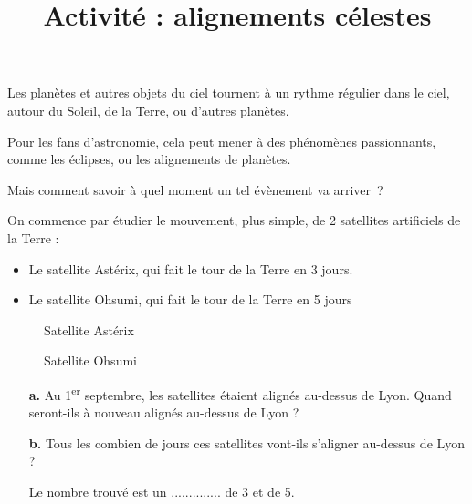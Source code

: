 \documentclass[a4paper,landscape,twocolumn]{article}
\title{Activité : alignements célestes}
\date{}
\begin{document}
\noindent\textbf{\huge {}}
\vspace{1em}

\begin{mybox}
	Les planètes et autres objets du ciel tournent à un rythme régulier dans le ciel, autour du Soleil, de la Terre, ou d’autres planètes.

	Pour les fans d’astronomie, cela peut mener à des phénomènes passionnants, comme les éclipses, ou les alignements de planètes.

	Mais comment savoir à quel moment un tel évènement va arriver ?
\end{mybox}
\begin{question}
	On commence par étudier le mouvement, plus simple, de 2 satellites artificiels de la Terre :
	\begin{itemize}
		\item Le satellite Astérix, qui fait le tour de la Terre en 3 jours.
		\item Le satellite Ohsumi, qui fait le tour de la Terre en 5 jours
	\end{itemize}

	\begin{figure}[h!]
		\captionsetup{labelformat=empty}
		\begin{floatrow}
			{\caption{Satellite Astérix}}

			{\caption{Satellite Ohsumi}}
		\end{floatrow}
	\end{figure}
	\begin{itemize}
		\item[\textbf{a.}] Au 1\textsuperscript{er} septembre, les satellites étaient alignés au-dessus de Lyon. Quand seront-ils à nouveau alignés au-dessus de Lyon ?
		\item[\textbf{b.}] Tous les combien de jours ces satellites vont-ils s'aligner au-dessus de Lyon ?

		      Le nombre trouvé est un .............. de 3 et de 5.
	\end{itemize}
\end{question}

\newpage
\end{document}
